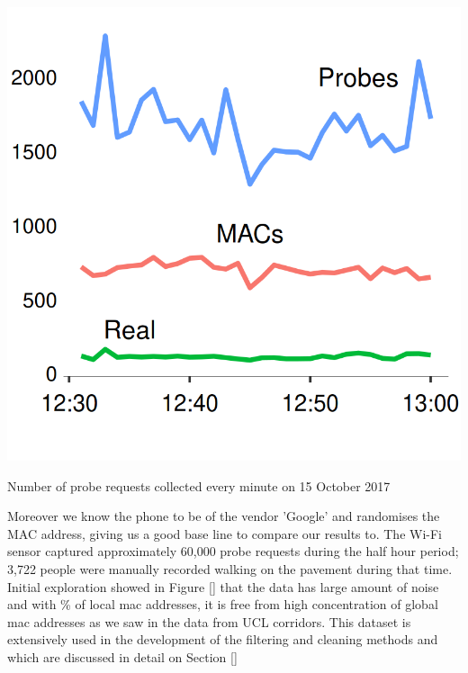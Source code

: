 \begin{marginfigure}
  \includegraphics[trim={0 0 0 0},clip]{images/oxst-counts.png}
  \caption{Number of probe requests collected every minute on 15 October 2017}
  \label{figure:collection:ucl:config}
\end{marginfigure}

Moreover we know the phone to be of the vendor 'Google' and randomises the MAC address, giving us a good base line to compare our results to.
The Wi-Fi sensor captured approximately 60,000 probe requests during the half hour period; 3,722 people were manually recorded walking on the pavement during that time.
Initial exploration showed in Figure \ref{} that the data has large amount of noise and with \% of local mac addresses, it is free from high concentration of global mac addresses as we saw in the data from UCL corridors.
This dataset is extensively used in the development of the filtering and cleaning methods and which are discussed in detail on Section \ref{}

